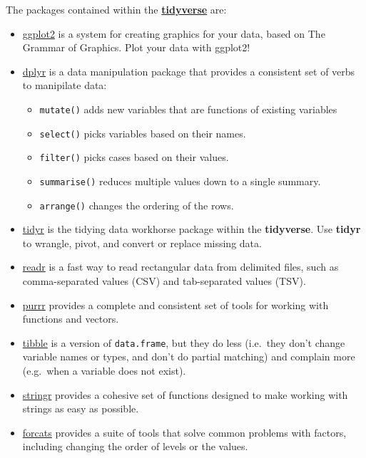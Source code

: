 \documentclass[
]{book}
\providecommand{\tightlist}{%
  \setlength{\itemsep}{0pt}\setlength{\parskip}{0pt}}
\begin{document}
The packages contained within the \href{https://www.tidyverse.org/packages/}{\textbf{tidyverse}} are:

\begin{itemize}
\tightlist
\item
  \href{https://ggplot2.tidyverse.org/}{ggplot2} is a system for creating graphics for your data, based on The Grammar of Graphics. Plot your data with ggplot2!
\item
  \href{https://dplyr.tidyverse.org/}{dplyr} is a data manipulation package that provides a consistent set of verbs to manipilate data:

  \begin{itemize}
  \tightlist
  \item
    \texttt{mutate()} adds new variables that are functions of existing variables
  \item
    \texttt{select()} picks variables based on their names.
  \item
    \texttt{filter()} picks cases based on their values.
  \item
    \texttt{summarise()} reduces multiple values down to a single summary.
  \item
    \texttt{arrange()} changes the ordering of the rows.
  \end{itemize}
\item
  \href{https://tidyr.tidyverse.org/}{tidyr} is the tidying data workhorse package within the \textbf{tidyverse}. Use \textbf{tidyr} to wrangle, pivot, and convert or replace missing data.
\item
  \href{https://readr.tidyverse.org/}{readr} is a fast way to read rectangular data from delimited files, such as comma-separated values (CSV) and tab-separated values (TSV).
\item
  \href{https://purrr.tidyverse.org/}{purrr} provides a complete and consistent set of tools for working with functions and vectors.
\item
  \href{https://tibble.tidyverse.org/}{tibble} is a version of \texttt{data.frame}, but they do less (i.e.~they don't change variable names or types, and don't do partial matching) and complain more (e.g.~when a variable does not exist).
\item
  \href{https://stringr.tidyverse.org/}{stringr} provides a cohesive set of functions designed to make working with strings as easy as possible.
\item
  \href{https://forcats.tidyverse.org/}{forcats} provides a suite of tools that solve common problems with factors, including changing the order of levels or the values.


\end{itemize}
\end{document}
